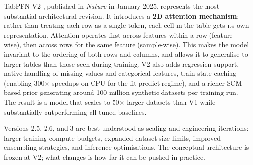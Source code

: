 \documentclass[12pt]{article}
\begin{document}
TabPFN V2 \cite{hollmann2025tabpfn}, published in \textit{Nature} in January 2025, represents the most substantial architectural revision. It introduces a \textbf{2D attention mechanism}: rather than treating each row as a single token, each cell in the table gets its own representation. Attention operates first across features within a row (feature-wise), then across rows for the same feature (sample-wise). This makes the model invariant to the ordering of both rows and columns, and allows it to generalise to larger tables than those seen during training. V2 also adds regression support, native handling of missing values and categorical features, train-state caching (enabling 300$\times$ speedups on CPU for the fit-predict regime), and a richer SCM-based prior generating around 100 million synthetic datasets per training run. The result is a model that scales to 50$\times$ larger datasets than V1 while substantially outperforming all tuned baselines.

Versions 2.5, 2.6, and 3 are best understood as scaling and engineering iterations: larger training compute budgets, expanded dataset size limits, improved ensembling strategies, and inference optimisations. The conceptual architecture is frozen at V2; what changes is how far it can be pushed in practice.
\end{document}
